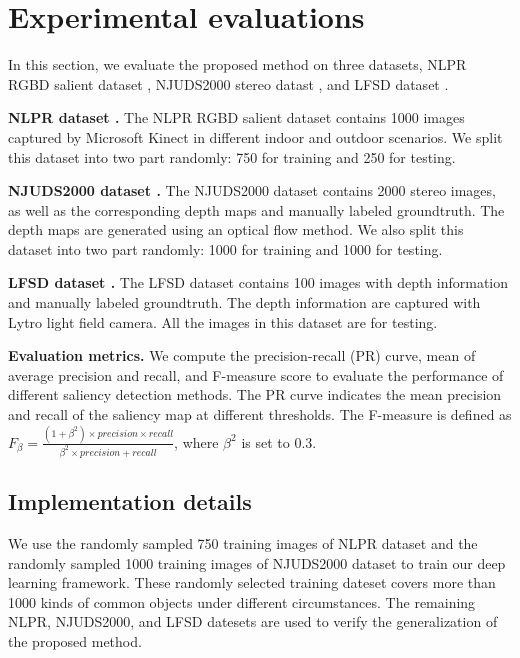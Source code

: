 \documentclass[journal]{IEEEtran}
\begin{document}
\section{Experimental evaluations}
In this section, we evaluate the proposed method on three datasets, NLPR RGBD salient dataset \cite{peng2014rgbd}, NJUDS2000 stereo datast \cite{ju2014depth}, and LFSD dataset \cite{Li_2014_CVPR}.

\textbf{NLPR dataset \cite{peng2014rgbd}.}
The NLPR RGBD salient dataset \cite{peng2014rgbd} contains 1000 images captured by Microsoft Kinect in different indoor and outdoor scenarios. We split this dataset into two part randomly: 750 for training and 250 for testing.

\textbf{NJUDS2000 dataset \cite{ju2014depth}.}
The NJUDS2000 dataset contains 2000 stereo images, as well as the corresponding depth maps and manually labeled groundtruth. The depth maps are generated using an optical flow method.
We also split this dataset into two part randomly: 1000 for training and 1000 for testing.

\textbf{LFSD dataset \cite{Li_2014_CVPR}.}
The LFSD dataset \cite{Li_2014_CVPR} contains 100 images with depth information and manually labeled groundtruth. The depth information are captured with Lytro light field camera. All the images in this dataset are for testing.

\textbf{Evaluation metrics.} We compute the precision-recall (PR) curve, mean of average precision and recall, and F-measure score to evaluate the performance of different saliency detection methods. The PR curve indicates the mean precision and recall of the saliency map at different thresholds. The F-measure is defined as ${F_\beta } = \frac{{(1 + {\beta ^2}) \times precision \times recall}}{{{\beta ^2} \times precision + recall}}$, where ${{\beta ^2}}$ is set to 0.3.

\subsection{Implementation details}
We use the randomly sampled 750 training images of NLPR dataset \cite{peng2014rgbd} and the randomly sampled 1000 training images of NJUDS2000 dataset \cite{ju2014depth} to train our deep learning framework. These randomly selected training dateset covers more than 1000 kinds of common objects under different circumstances. The remaining NLPR, NJUDS2000, and LFSD datesets are used to verify the generalization of the proposed method.
\end{document}
